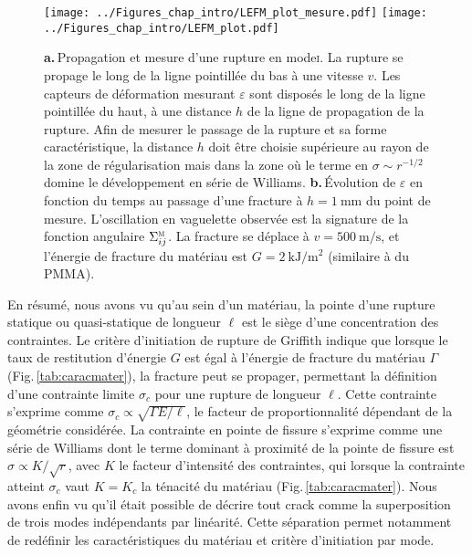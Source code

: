 \begin{figure}[p]
\centering
\texttt{[image: ../Figures\_chap\_intro/LEFM\_plot\_mesure.pdf]}
\texttt{[image: ../Figures\_chap\_intro/LEFM\_plot.pdf]}
\caption[Simulation d'une rupture dynamique en mode \textsc{i}]{\textbf{a.}\,Propagation et mesure d'une rupture en mode\:\textsc{i}. La rupture se propage le long de la ligne pointillée du bas à une vitesse $v$. Les capteurs de déformation mesurant $\varepsilon$ sont disposés le long de la ligne pointillée du haut, à une distance $h$ de la ligne de propagation de la rupture. Afin de mesurer le passage de la rupture et sa forme caractéristique, la distance $h$ doit être choisie supérieure au rayon de la zone de régularisation mais dans la zone où le terme en $\sigma\sim r^{-1/2}$ domine le développement en série de Williams. \textbf{b.}\,Évolution de $\varepsilon$ en fonction du temps au passage d'une fracture à $h=\SI{1}{\milli\meter}$ du point de mesure. L'oscillation en vaguelette observée est la signature de la fonction angulaire $\Sigma_{ij}^\textsc{m}$. La fracture se déplace à $v=\SI{500}{\meter\per\second}$, et l'énergie de fracture du matériau est $G=\SI{2}{\kilo\joule\per\meter\squared}$ (similaire à du PMMA).}
\label{fig:simulfrac}
\end{figure}








En résumé, nous avons vu qu'au sein d'un matériau, la pointe d'une rupture statique ou quasi-statique de longueur $\ell$ est le siège d'une concentration des contraintes. Le critère d'initiation de rupture de Griffith indique que lorsque le taux de restitution d'énergie $G$ est égal à l'énergie de fracture du matériau $\Gamma$ (Fig.\,\ref{tab:caracmater}), la fracture peut se propager, permettant la définition d'une contrainte limite $\sigma_c$ pour une rupture de longueur $\ell$. Cette contrainte s'exprime comme $\sigma_c\propto\sqrt{\Gamma E/\ell}$, le facteur de proportionnalité dépendant de la géométrie considérée. La contrainte en pointe de fissure s'exprime comme une série de Williams dont le terme dominant à proximité de la pointe de fissure est $\sigma\propto K/\sqrt{r}$, avec $K$ le facteur d'intensité des contraintes, qui lorsque la contrainte atteint $\sigma_c$ vaut $K = K_c$ la ténacité du matériau (Fig.\,\ref{tab:caracmater}). Nous avons enfin vu qu'il était possible de décrire tout crack comme la superposition de trois modes indépendants par linéarité. Cette séparation permet notamment de redéfinir les caractéristiques du matériau et critère d'initiation par mode.

